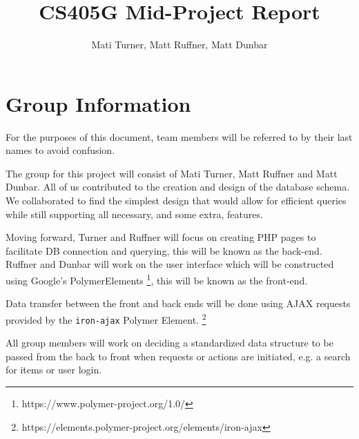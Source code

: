 \documentclass[letterpaper]{article}
\title{CS405G Mid-Project Report}
\author{Mati Turner, Matt Ruffner, Matt Dunbar}
\begin{document}
\maketitle

\section{Group Information}
For the purposes of this document, team members will be referred to by their last names to avoid confusion.

The group for this project will consist of Mati Turner, Matt Ruffner and Matt Dunbar. All of us contributed to the creation and design of the database schema. We collaborated to find the simplest design that would allow for efficient queries while still supporting all necessary, and some extra, features.

Moving forward, Turner and Ruffner will focus on creating PHP pages to facilitate DB connection and querying, this will be known as the back-end. Ruffner and Dunbar will work on the user interface which will be constructed using Google's PolymerElements \footnote{https://www.polymer-project.org/1.0/}, this will be known as the front-end.

Data transfer between the front and back ends will be done using AJAX requests provided by the \texttt{iron-ajax} Polymer Element. \footnote{https://elements.polymer-project.org/elements/iron-ajax}

All group members will work on deciding a standardized data structure to be passed from the back to front when requests or actions are initiated, e.g. a search for items or user login.




\end{document}
